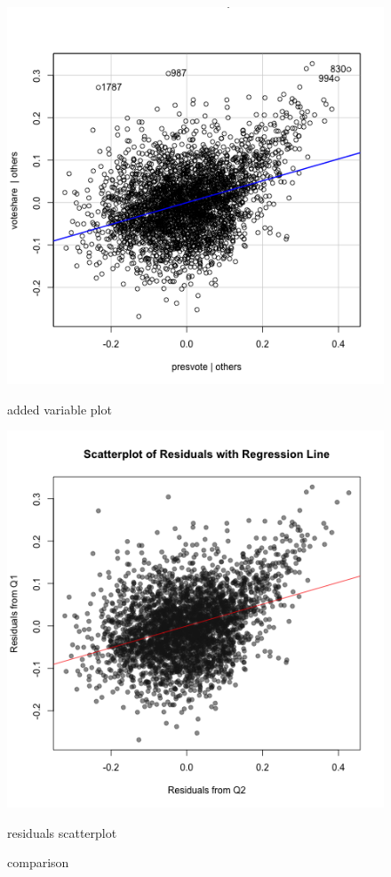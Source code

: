 \documentclass[12pt,letterpaper]{article}
\begin{document}
\begin{figure}
	\begin{minipage}[t]{0.5\textwidth} 
		\centering
		\includegraphics[width=\linewidth]{added_variable_plot_presvote.png}
		\caption{added variable plot}
		\label{fig:subfig1}
	\end{minipage}%
	\begin{minipage}[t]{0.5\textwidth} 
		\centering
		\includegraphics[width=\linewidth]{scatterplot_residuals_q1_q2.png}
		\caption{residuals scatterplot}
		\label{fig:subfig2}
	\end{minipage}
	\caption{comparison}
	\label{fig:combined}
\end{figure}
\end{document}
